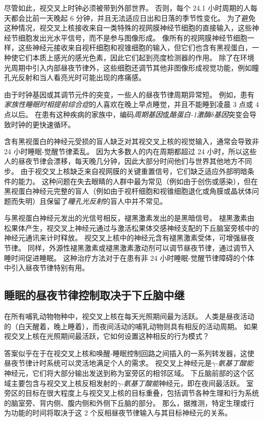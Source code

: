 尽管如此，视交叉上时钟必须被带到外部世界。
否则，每个 24.1 小时周期的人每天都会比前一天晚起 6 分钟，并且无法适应日出和日落的季节性变化。
为了避免这种情况，视交叉上核接收来自一类特殊的视网膜神经节细胞的直接输入，这些神经节细胞发出光水平信号，而不是参与图像形成。
像所有的视网膜神经节细胞一样，这些神经元接收来自视杆细胞和视锥细胞的输入，但它们也含有黑视蛋白，一种使它们本质上感光的感光色素，因此它们起到亮度检测器的作用。
除了在环境光周期中引入内部昼夜节律外，这些细胞还调节其他非图像形成视觉功能，例如瞳孔光反射和当人看亮光时可能出现的疼痛感。


由于时钟基因或其调节元件的突变，一些人的昼夜节律周期异常短。
例如，患有\textit{家族性睡眠时相提前综合症}的人喜欢在晚上早点睡觉，并且不能睡到凌晨 3 点或 4 点以后。
在患有这种疾病的家族中，编码\textit{周期基因}或\textit{酪蛋白-1激酶$\delta$基因}突变会导致时钟的更快速循环。


含有黑视蛋白的神经元受损的盲人缺乏对其视交叉上核的视觉输入，通常会导致非 24 小时睡眠-觉醒节律紊乱。
因为大多数人的内在周期都超过 24 小时，所以这些人的昼夜节律会漂移，每天晚几分钟，因此大部分时间他们与世界其他地方不同步。
由于视交叉上核缺乏来自视网膜的关键重置信号，它们缺乏适应外部明暗条件的能力。
这种问题在失去眼睛的人群中最为常见（例如由于创伤或感染），但在黑视蛋白神经元完整的盲人（例如由于视杆细胞和视锥细胞退化或角膜或晶状体问题而失明）且保留了\textit{瞳孔光反射}的盲人中并不常见。


与黑视蛋白神经元发出的光信号相反，褪黑激素发出的是黑暗信号。
褪黑激素由松果体产生，视交叉上神经元通过与激活松果体交感神经支配的下丘脑室旁核中的神经元通讯来计时释放。
视交叉上核中的神经元含有褪黑激素受体，可增强昼夜节律。
同样，外源性褪黑激素或褪黑激素激动剂可以调节昼夜节律，通过调节入睡时间促进睡眠。
这种治疗方法对于在患有非 24 小时睡眠-觉醒节律障碍的个体中引入昼夜节律特别有用。



\subsection{睡眠的昼夜节律控制取决于下丘脑中继}

在所有哺乳动物物种中，视交叉上核在每天光照期间最为活跃。
人类是昼夜活动的（白天醒着，晚上睡着），而夜间活动的哺乳动物则具有相反的活动周期。
如果视交叉上核在光照期间最活跃，它如何设置这种相反的行为模式？


答案似乎在于在视交叉上核和唤醒-睡眠控制回路之间插入的一系列转发器，这使昼夜节律计时系统可以灵活地满足个人的需求。
视交叉上神经元是\textit{$\gamma$-氨基丁酸能}神经元，它们将大部分输出发送到称为室旁区的相邻区域。
下丘脑前部的这个区域主要包含与视交叉上核反相发射的\textit{$\gamma$-氨基丁酸能}神经元，即在夜间最活跃。
室旁区的目标在很大程度上与视交叉上核的目标重叠，包括调节各种生理和行为系统的脑室旁、背内侧、腹内侧和外侧下丘脑的部分。
那么，据推测，特定生理或行为功能的时间将取决于这 2 个反相昼夜节律输入与其目标神经元的关系。


